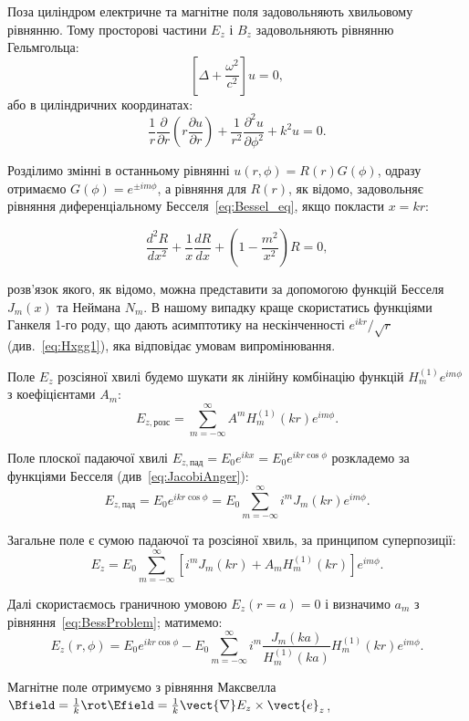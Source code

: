 \begin{problem}
\begin{solution}
	Поза циліндром електричне та магнітне поля задовольняють хвильовому рівнянню.
	Тому просторові частини $E_z$ і $B_z$ задовольняють рівнянню Гельмгольца:
	\[
		\left[ \Delta + \frac{\omega^2}{c^2}\right] u = 0,
	\]
	або в циліндричних координатах:
	\[
		\frac1r \frac{\partial }{\partial r}
		\left( r \frac{\partial u}{\partial r} \right) + \frac{1}{r^2} \frac{\partial^2 u}{\partial \phi^2} + k^2 u = 0.
	\]

	Розділимо змінні в останньому рівнянні $u(r,\phi) = R(r)G(\phi)$, одразу отримаємо $G(\phi) = e^{\pm im\phi}$, а рівняння для $R(r)$, як відомо, задовольняє рівняння диференціальному Бесселя~\eqref{eq:Bessel_eq}, якщо покласти $x = kr$:

\begin{equation}\label{eq:BessProblem}\tag{*}
		\frac{d^2R}{dx^2} + \frac1x\frac{dR}{dx} + \left(1 - \frac{m^2}{x^2} \right) R = 0,
\end{equation}

	розв'язок якого, як відомо, можна представити за допомогою функцій Бесселя $J_m(x)$ та Неймана $N_m$.
    В нашому випадку краще скористатись функціями Ганкеля 1-го роду, що дають асимптотику на нескінченності $e^{ikr}/\sqrt{r}$ (див.~\eqref{eq:Hxgg1}), яка відповідає умовам випромінювання.

    Поле  $E_z$ розсіяної хвилі будемо шукати як  лінійну комбінацію функцій $H_m^{(1)}e^{im\phi}$ з коефіцієнтами $A_m$:
	\[
		E_{z,\text{розс}} =  \sum\limits_{m = -\infty}^{\infty} A^m H^{(1)}_m(k r)e^{im\phi}.
	\]

	Поле плоскої падаючої хвилі $ E_{z,\text{пад}} = E_0e^{ikx} = E_0e^{ikr\cos\phi}$ розкладемо за функціями Бесселя (див~\eqref{eq:JacobiAnger}):
	\[
		E_{z,\text{пад}} =  E_0e^{ikr\cos\phi} =  E_0 \sum\limits_{m = -\infty}^{\infty} i^m J_m(k r)e^{im\phi}.
	\]

	Загальне поле є сумою падаючої та розсіяної хвиль, за принципом суперпозиції:
	\[
		E_z = E_0 \sum\limits_{m = -\infty}^{\infty}[ i^mJ_m(kr) + A_mH^{(1)}_m(kr)]e^{im\phi}.
	\]

	Далі скористаємось граничною умовою $E_z(r = a) = 0$  і визначимо $a_m$ з рівняння~\eqref{eq:BessProblem}; матимемо:
	\[
		E_z(r,\phi) = E_0e^{ikr\cos\phi} - E_0\sum\limits_{m = -\infty}^{\infty} i^m \frac{J_m(ka)}{H_m^{(1)}(ka)}H_m^{(1)}(kr)e^{im\phi}.
	\]

    Магнітне поле отримуємо з рівняння Максвелла $\Bfield = \frac1k\rot\Efield = \frac1k \vect{\nabla}E_z\times \vect{e}_z$,


\end{solution}
\end{problem}
